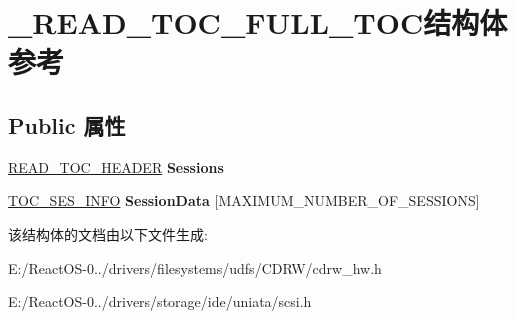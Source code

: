 \hypertarget{struct___r_e_a_d___t_o_c___f_u_l_l___t_o_c}{}\section{\+\_\+\+R\+E\+A\+D\+\_\+\+T\+O\+C\+\_\+\+F\+U\+L\+L\+\_\+\+T\+O\+C结构体 参考}
\label{struct___r_e_a_d___t_o_c___f_u_l_l___t_o_c}
\subsection*{Public 属性}
\begin{DoxyCompactItemize}
\item 
\mbox{\label{struct___r_e_a_d___t_o_c___f_u_l_l___t_o_c_a1ee839d6d1722a5e4dd671637837a99c}} 
\hyperlink{struct___r_e_a_d___t_o_c___h_e_a_d_e_r}{R\+E\+A\+D\+\_\+\+T\+O\+C\+\_\+\+H\+E\+A\+D\+ER} {\bfseries Sessions}
\item 
\mbox{\label{struct___r_e_a_d___t_o_c___f_u_l_l___t_o_c_a1ffea4fc67256f94c38dc2045040caec}} 
\hyperlink{struct___t_o_c___s_e_s___i_n_f_o}{T\+O\+C\+\_\+\+S\+E\+S\+\_\+\+I\+N\+FO} {\bfseries Session\+Data} \mbox{[}M\+A\+X\+I\+M\+U\+M\+\_\+\+N\+U\+M\+B\+E\+R\+\_\+\+O\+F\+\_\+\+S\+E\+S\+S\+I\+O\+NS\mbox{]}
\end{DoxyCompactItemize}


该结构体的文档由以下文件生成\+:\begin{DoxyCompactItemize}
\item 
E\+:/\+React\+O\+S-\/0../drivers/filesystems/udfs/\+C\+D\+R\+W/cdrw\+\_\+hw.\+h\item 
E\+:/\+React\+O\+S-\/0../drivers/storage/ide/uniata/scsi.\+h\end{DoxyCompactItemize}
